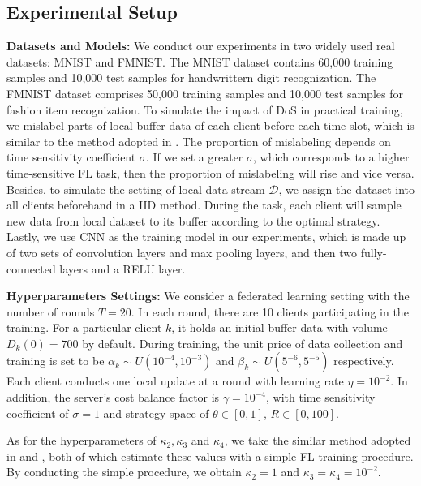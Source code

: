 \documentclass{article}
\theoremstyle{plain}
\theoremstyle{definition}
\theoremstyle{remark}
\begin{document}
\subsection{Experimental Setup}
\textbf{Datasets and Models: }
We conduct our experiments in two widely used real datasets: MNIST and FMNIST.
The MNIST dataset contains 60,000 training samples and 10,000 test samples for handwrittern digit recognization.
The FMNIST dataset comprises 50,000 training samples and 10,000 test samples for fashion item recognization.
To simulate the impact of DoS in practical training, we mislabel parts of local buffer data of each client before each time slot, which is similar to the method adopted in \cite{xu2024age}. 
The proportion of mislabeling depends on time sensitivity coefficient $\sigma$. If we set a greater $\sigma$, which corresponds to a higher time-sensitive FL task, then the proportion of mislabeling will rise and vice versa.
Besides, to simulate the setting of local data stream $\mathcal{D}$, we assign the dataset into all clients beforehand in a IID method. During the task, each client will sample new data from local dataset to its buffer according to the optimal strategy.
Lastly, we use CNN as the training model in our experiments, which is made up of two sets of convolution layers and max pooling layers, and then two fully-connected layers and a RELU layer.

\textbf{Hyperparameters Settings: }
We consider a federated learning setting with the number of rounds $T = 20$. In each round, there are 10 clients participating in the training.
For a particular client $k$, it holds an initial buffer data with volume $D_k(0) = 700$ by default. During training, the unit price of data collection and training is set to be $\alpha_k \sim U(10^{-4}, 10^{-3})$ and $\beta_k \sim U(5^{-6}, 5^{-5})$ respectively. Each client conducts one local update at a round with learning rate $\eta=10^{-2}$.
In addition, the server's cost balance factor is $\gamma = 10^{-4}$, with time sensitivity coefficient of $\sigma = 1$ and strategy space of $\theta \in [0, 1]$, $R \in [0, 100]$.

As for the hyperparameters of $\kappa_2, \kappa_3$ and $\kappa_4$, we take the similar method adopted in \cite{wang2019adaptive} and \cite{huang2024collaboration}, both of which estimate these values with a simple FL training procedure.
By conducting the simple procedure, we obtain $\kappa_2 = 1$ and  $\kappa_3 = \kappa_4 = 10^{-2}$.
\end{document}
